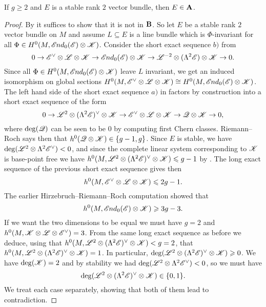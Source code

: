 \documentclass[A4paper, 12pt, british, reqno]{amsart}
\newcommand{\ot}{\otimes}
\newcommand{\dual}{^{\vee}}
\newcommand{\1}{\mathbbm{1}}
\begin{document}
\begin{lm}\label{lm:stable}
    If $g\geqslant 2$ and $E$ is a stable rank $2$ vector bundle, then $E\in \mathbf{A}$.
    \color{gray}
    \begin{proof}
	By  it suffices to show that it is not in $\mathbf{B}$.
	So let $E$ be a stable rank $2$ vector bundle on $M$ and assume $L\subseteq E$ is a line bundle which is $\Phi$-invariant for all $\Phi\in H^{0}(M,\sEnd_{0}(\E)\ot \sK)$.
	Consider the short exact sequence $b)$ from 
	\[ 0\to \E\dual\ot \L\ot\sK\to \sEnd_{0}(\E)\ot \sK \to \L^{-2}\ot (\Lambda^{2}\E)\ot\sK\to 0. \]
	Since all $\Phi\in H^{0}(M,\sEnd_{0}(\E)\ot\sK)$ leave $L$ invariant, we get an induced isomorphism on global sections $H^{0}(M,\E\dual\ot\L\ot\sK)\cong H^{0}(M,\sEnd_{0}(\E)\ot \sK)$.
	The left hand side of the short exact sequence $a)$ in  factors by construction into a short exact sequence of the form 
	\[ 0\to \L^{2}\ot (\Lambda^{2}\E)\dual\ot\sK \to \E\dual \ot \L\ot \sK\to \sQ\ot\sK\to 0, \]
	where $\deg(\mathscr{Q})$ can be seen to be $0$ by computing first Chern classes.
	Riemann--Roch says then that $h^{0}(\sQ\ot\sK)\in \{g-1,g\}$.
	Since $E$ is stable, we have $\deg(\L^{2}\ot \Lambda^{2}\E\dual)<0$, and since the complete linear system corresponding to $\mathscr{K}$ is base-point free \cite[Lemma IV.5.1]{har77}
	    we have $h^{0}(M,\L^{2}\ot(\Lambda^{2}\E)\dual\ot\sK)\leqslant g-1$ by \cite[Proposition IV.3.1]{har77}.
	The long exact sequence of the previous short exact sequence gives then
	\[ h^{0}(M,\E\dual\ot\L\ot\sK)\leqslant 2g-1. \]
	The earlier Hirzebruch--Riemann--Roch computation showed that
	\[ h^{0}(M,\sEnd_{0}(\E)\ot \sK)\geqslant 3g-3. \]
	If we want the two dimensions to be equal we must have $g=2$ and $h^{0}(M,\sK\ot\L\ot\E\dual)=3$.
	From the same long exact sequence as before we deduce, using that $h^{0}(M,\L^{2}\ot (\Lambda^{2}\E)\dual\ot \sK)<g=2$, that $h^{0}(M,\L^{2}\ot(\Lambda^{2}\E)\dual\ot\sK)=1$.
	In particular, $\deg(\L^{2}\ot(\Lambda^{2}\E)\dual\ot\sK)\geqslant 0$.
	We have $\deg(\mathscr{K})=2$ and by stability we had $\deg(\L^{2}\ot \Lambda^{2}\E\dual)<0$, so we must have
	\[ \deg(\L^{2}\ot (\Lambda^{2}\E)\dual\ot\sK)\in \{0,1\}. \]
	We treat each case separately, showing that both of them lead to contradiction.


\end{proof}
\end{lm}
\end{document}
